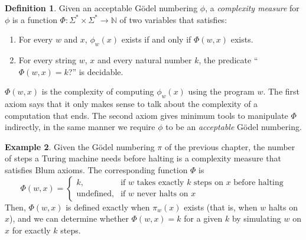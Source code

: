\documentclass[12pt]{article}
\theoremstyle{definition}
\newtheorem{definition}{Definition}
\newtheorem{example}[definition]{Example}
\begin{document}
\begin{definition}
    Given an acceptable Gödel numbering $\phi$,
    a \emph{complexity measure} for $\phi$
    is a function $\Phi:\Sigma^* \times \Sigma^* \to \mathbb N$ of two variables
    that satisfies: \cite[p.~324]{Blum1967}
    \begin{enumerate}
        \item For every $w$ and $x$,
            $\phi_w(x)$ exists if and only if $\Phi(w, x)$ exists.
        \item For every string $w$, $x$ and every natural number $k$,
            the predicate ``$\Phi(w, x) = k$?'' is decidable.
    \end{enumerate}
\end{definition}

$\Phi(w, x)$ is the complexity of computing $\phi_w(x)$
using the program $w$.
The first axiom says that it only makes sense
to talk about the complexity of a computation that ends.
The second axiom gives minimum tools to manipulate $\Phi$ indirectly,
in the same manner we require $\phi$ to be an \emph{acceptable} Gödel numbering.

\begin{example}
    Given the Gödel numbering $\pi$ of the previous chapter,
    the number of steps a Turing machine needs before halting
    is a complexity measure that satisfies Blum axioms.
    The corresponding function $\Phi$ is
    \begin{equation*}
        \Phi(w, x) = \begin{cases}
            k, &\text{if $w$ takes exactly $k$ steps on $x$ before halting} \\
            \text{undefined}, &\text{if $w$ never halts on $x$}
        \end{cases}
    \end{equation*}
    Then, $\Phi(w, x)$ is defined exactly when $\pi_w(x)$ exists
    (that is, when $w$ halts on $x$),
    and we can determine whether $\Phi(w, x) = k$ for a given $k$
    by simulating $w$ on $x$ for exactly $k$ steps.
\end{example}
\end{document}
